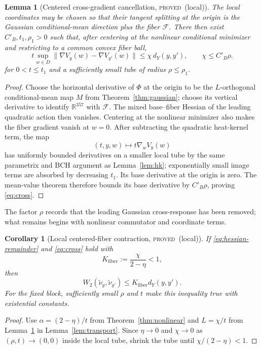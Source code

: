 \documentclass[11pt]{article}
\newcommand{\proved}{\textcolor{provedgreen}{\textsc{proved}}}
\newcommand{\R}{\mathbb R}
\newtheorem{lemma}[definition]{Lemma}
\newtheorem{corollary}[definition]{Corollary}
\theoremstyle{remark}
\begin{document}
\begin{lemma}[Centered cross-gradient cancellation, \proved\ (local)]
\label{lem:cross}
The local coordinates may be chosen so that their tangent splitting at the
origin is the Gaussian conditional-mean direction plus the fiber $\mathcal F$.
There then exist $C'_B,t_1,\rho_1>0$ such that, after centering at the nonlinear
conditional minimizer and restricting to a common convex fiber ball,
\begin{equation}\label{eq:cross}
 t\sup_{w\in D}
 \|\nabla V_y(w)-\nabla V_{y'}(w)\|
 \le \chi\,d_Y(y,y'),
 \qquad \chi\le C'_B\rho.
\end{equation}
for $0<t\le t_1$ and a sufficiently small tube of radius $\rho\le\rho_1$.
\end{lemma}
\begin{proof}
Choose the horizontal derivative of $\Phi$ at the origin to be the
$L$-orthogonal conditional-mean map $M$ from
Theorem~\ref{thm:gaussian}; choose its vertical derivative to identify
$\R^{357}$ with $\mathcal F$.  The mixed base--fiber Hessian of the leading
quadratic action then vanishes.  Centering at the nonlinear minimizer also
makes the fiber gradient vanish at $w=0$.  After subtracting the quadratic
heat-kernel term, the map
\[
 (t,y,w)\longmapsto t\nabla_wV_y(w)
\]
has uniformly bounded derivatives on a smaller local tube by the same
parametrix and BCH argument as Lemma~\ref{lem:hk}; exponentially small image
terms are absorbed by decreasing $t_1$.  Its base derivative at the origin is
zero.  The mean-value theorem therefore bounds its base derivative by
$C'_B\rho$, proving \eqref{eq:cross}.
\end{proof}

The factor $\rho$ records that the leading Gaussian cross-response has been
removed; what remains begins with nonlinear commutator and coordinate terms.

\begin{corollary}[Local centered-fiber contraction, \proved\ (local)]
If \eqref{eq:hessian-remainder} and \eqref{eq:cross} hold with
\[
 K_{\mathrm{fiber}}:=\frac{\chi}{2-\eta}<1,
\]
then
\[
 W_2(\widetilde\nu_y,\widetilde\nu_{y'})
 \le K_{\mathrm{fiber}}d_Y(y,y').
\]
For the fixed block, sufficiently small $\rho$ and $t$ make this inequality
true with existential constants.
\end{corollary}
\begin{proof}
Use $\alpha=(2-\eta)/t$ from Theorem~\ref{thm:nonlinear} and
$L=\chi/t$ from Lemma~\ref{lem:cross} in Lemma~\ref{lem:transport}.  Since
$\eta\to0$ and $\chi\to0$ as $(\rho,t)\to(0,0)$ inside the local tube, shrink
the tube until $\chi/(2-\eta)<1$.
\end{proof}
\end{document}
